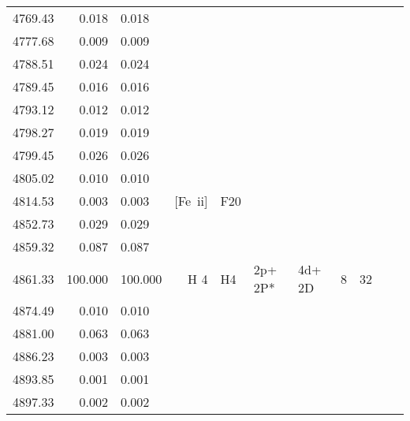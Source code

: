 \begin{longtable}{lrlrlllllll}
 4769.43 &   0.018 &   0.018                                                                                      \\
 4777.68 &   0.009 &   0.009                                                                                      \\
 4788.51 &   0.024 &   0.024                                                                                      \\
 4789.45 &   0.016 &   0.016                                                                                      \\
 4793.12 &   0.012 &   0.012                                                                                      \\
 4798.27 &   0.019 &   0.019                                                                                      \\
 4799.45 &   0.026 &   0.026                                                                                      \\
 4805.02 &   0.010 &   0.010                                                                                      \\
 4814.53 &   0.003 &   0.003 &  [Fe~{\sc ii}]   &  F20       &            &            &            &             \\
 4852.73 &   0.029 &   0.029                                                                                      \\
 4859.32 &   0.087 &   0.087                                                                                      \\
 4861.33 & 100.000 & 100.000 &  H 4       &  H4        &  2p+ 2P*   &  4d+ 2D    &          8 &       32          \\
 4874.49 &   0.010 &   0.010                                                                                      \\
 4881.00 &   0.063 &   0.063                                                                                      \\
 4886.23 &   0.003 &   0.003                                                                                      \\
 4893.85 &   0.001 &   0.001                                                                                      \\
 4897.33 &   0.002 &   0.002                                                                                      \\

\end{longtable}
